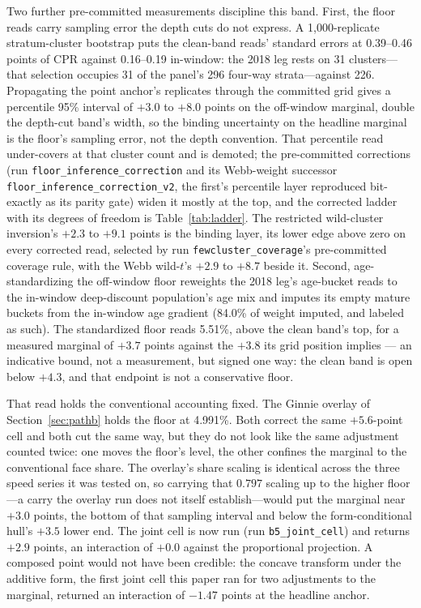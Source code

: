 Two further pre-committed measurements discipline this band. First, the floor reads carry sampling error the depth cuts do not express. A 1{,}000-replicate stratum-cluster bootstrap puts the clean-band reads' standard errors at 0.39--0.46 points of CPR against 0.16--0.19 in-window: the 2018 leg rests on 31 clusters---that selection occupies 31 of the panel's 296 four-way strata---against 226. Propagating the point anchor's replicates through the committed grid gives a percentile 95\% interval of $+3.0$ to $+8.0$ points on the off-window marginal, double the depth-cut band's width, so the binding uncertainty on the headline marginal is the floor's sampling error, not the depth convention. That percentile read under-covers at that cluster count and is demoted; the pre-committed corrections (run \texttt{floor\_inference\_correction} and its Webb-weight successor \texttt{floor\_inference\_correction\_v2}, the first's percentile layer reproduced bit-exactly as its parity gate) widen it mostly at the top, and the corrected ladder with its degrees of freedom is Table~\ref{tab:ladder}. The restricted wild-cluster inversion's $+2.3$ to $+9.1$ points is the binding layer, its lower edge above zero on every corrected read, selected by run \texttt{fewcluster\_coverage}'s pre-committed coverage rule, with the Webb wild-$t$'s $+2.9$ to $+8.7$ beside it. Second, age-standardizing the off-window floor reweights the 2018 leg's age-bucket reads to the in-window deep-discount population's age mix and imputes its empty mature buckets from the in-window age gradient (84.0\% of weight imputed, and labeled as such). The standardized floor reads 5.51\%, above the clean band's top, for a measured marginal of $+3.7$ points against the $+3.8$ its grid position implies --- an indicative bound, not a measurement, but signed one way: the clean band is open below $+4.3$, and that endpoint is not a conservative floor.

That read holds the conventional accounting fixed. The Ginnie overlay of Section~\ref{sec:pathb} holds the floor at 4.991\%. Both correct the same $+5.6$-point cell and both cut the same way, but they do not look like the same adjustment counted twice: one moves the floor's level, the other confines the marginal to the conventional face share. The overlay's share scaling is identical across the three speed series it was tested on, so carrying that $0.797$ scaling up to the higher floor---a carry the overlay run does not itself establish---would put the marginal near $+3.0$ points, the bottom of that sampling interval and below the form-conditional hull's $+3.5$ lower end. The joint cell is now run (run \texttt{b5\_joint\_cell}) and returns $+2.9$ points, an interaction of $+0.0$ against the proportional projection. A composed point would not have been credible: the concave transform under the additive form, the first joint cell this paper ran for two adjustments to the marginal, returned an interaction of $-1.47$ points at the headline anchor.

